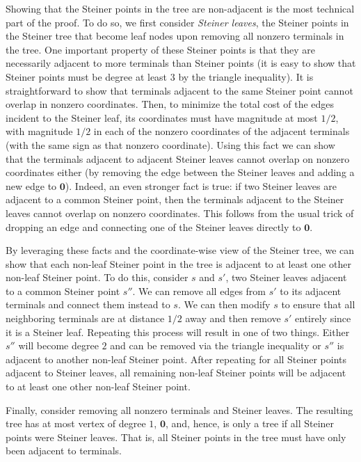 \documentclass{theoretics}
\newcommand{\1}{\textbf{1}}
\begin{document}
Showing that the Steiner points in the tree are non-adjacent is the most technical part of the proof. To do so, we first consider \textit{Steiner leaves}, the Steiner points in the Steiner tree that become leaf nodes upon removing all nonzero terminals in the tree. One important property of these Steiner points is that they are necessarily adjacent to more terminals than Steiner points (it is easy to show that Steiner points must be degree at least $3$ by the triangle inequality). It is straightforward to show that terminals adjacent to the same Steiner point cannot overlap in nonzero coordinates. Then, to minimize the total cost of the edges incident to the Steiner leaf, its coordinates must have magnitude at most $1/2$, with magnitude $1/2$ in each of the nonzero coordinates of the adjacent terminals (with the same sign as that nonzero coordinate). Using this fact we can show that the terminals adjacent to adjacent Steiner leaves cannot overlap on nonzero coordinates either (by removing the edge between the Steiner leaves and adding a new edge to $\mathbf{0}$). Indeed, an even stronger fact is true: if two Steiner leaves are adjacent to a common Steiner point, then the terminals adjacent to the Steiner leaves cannot overlap on nonzero coordinates. This follows from the usual trick of dropping an edge and connecting one of the Steiner leaves directly to $\mathbf{0}$.

By leveraging these facts and the coordinate-wise view of the Steiner tree, we can show that each non-leaf Steiner point in the tree is adjacent to at least one other non-leaf Steiner point. To do this, consider $s$ and $s'$, two Steiner leaves adjacent to a common Steiner point $s''$. We can remove all edges from $s'$ to its adjacent terminals and connect them instead to $s$. We can then modify $s$ to ensure that all neighboring terminals are at distance $1/2$ away and then remove $s'$ entirely since it is a Steiner leaf. Repeating this process will result in one of two things. Either $s''$ will become degree $2$ and can be removed via the triangle inequality or $s''$ is adjacent to another non-leaf Steiner point. After repeating for all Steiner points adjacent to Steiner leaves, all remaining non-leaf Steiner points will be adjacent to at least one other non-leaf Steiner point.

Finally, consider removing all nonzero terminals and Steiner leaves. The resulting tree has at most vertex of degree $1$, $\mathbf{0}$, and, hence, is only a tree if all Steiner points were Steiner leaves. That is, all Steiner points in the tree must have only been adjacent to terminals. 
\end{document}
